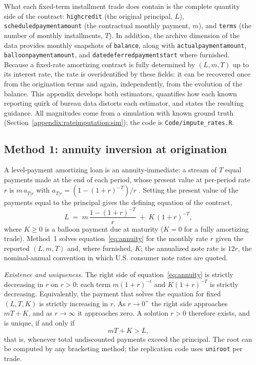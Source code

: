 What each fixed-term installment trade does contain is the complete quantity side of the contract: \texttt{highcredit} (the original principal, $L$), \texttt{scheduled\allowbreak payment\allowbreak amount} (the contractual monthly payment, $m$), and \texttt{terms} (the number of monthly installments, $T$). In addition, the archive dimension of the data provides monthly snapshots of \texttt{balance}, along with \texttt{actual\allowbreak payment\allowbreak amount}, \texttt{balloon\allowbreak payment\allowbreak amount}, and \texttt{date\allowbreak deferred\allowbreak payment\allowbreak start} where furnished. Because a fixed-rate amortizing contract is fully determined by $(L, m, T)$ up to its interest rate, the rate is overidentified by these fields: it can be recovered once from the origination terms and again, independently, from the evolution of the balance. This appendix develops both estimators, quantifies how each known reporting quirk of bureau data distorts each estimator, and states the resulting guidance. All magnitudes come from a simulation with known ground truth (Section~\ref{appendix:rateimputation:sim}); the code is \texttt{Code/impute\_rates.R}.

\subsection{Method 1: annuity inversion at origination}\label{appendix:rateimputation:m1}

A level-payment amortizing loan is an annuity-immediate: a stream of $T$ equal payments made at the end of each period, whose present value at per-period rate $r$ is $m \, a_{\overline{T}|r}$ with $a_{\overline{T}|r} = \left(1-(1+r)^{-T}\right)/r$ \citep{kellison_theory_2008}. Setting the present value of the payments equal to the principal gives the defining equation of the contract,
\begin{equation}\label{eq:annuity}
L \;=\; m \, \frac{1-(1+r)^{-T}}{r} \;+\; K\,(1+r)^{-T},
\end{equation}
where $K \ge 0$ is a balloon payment due at maturity ($K = 0$ for a fully amortizing trade). Method~1 solves equation~\eqref{eq:annuity} for the monthly rate $r$ given the reported $(L, m, T)$ and, where furnished, $K$; the annualized note rate is $12r$, the nominal-annual convention in which U.S. consumer note rates are quoted.

\emph{Existence and uniqueness.} The right side of equation~\eqref{eq:annuity} is strictly decreasing in $r$ on $r > 0$: each term $m(1+r)^{-t}$ and $K(1+r)^{-T}$ is strictly decreasing. Equivalently, the payment that solves the equation for fixed $(L, T, K)$ is strictly increasing in $r$. As $r \to 0^{+}$ the right side approaches $mT + K$, and as $r \to \infty$ it approaches zero. A solution $r > 0$ therefore exists, and is unique, if and only if
\begin{equation}\label{eq:existence}
mT + K > L,
\end{equation}
that is, whenever total undiscounted payments exceed the principal. The root can be computed by any bracketing method; the replication code uses \texttt{uniroot} per trade.

